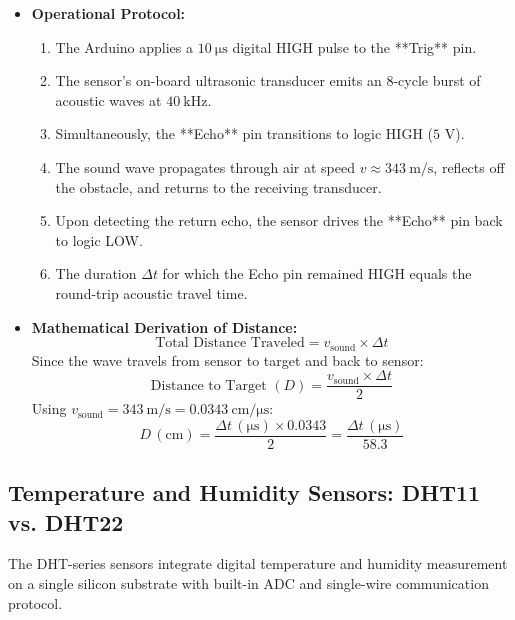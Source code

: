 \begin{itemize}
    \item \textbf{Operational Protocol:}
    \begin{enumerate}
        \item The Arduino applies a $\SI{10}{\micro\second}$ digital HIGH pulse to the **Trig** pin.
        \item The sensor's on-board ultrasonic transducer emits an 8-cycle burst of acoustic waves at $\SI{40}{\kilo\hertz}$.
        \item Simultaneously, the **Echo** pin transitions to logic HIGH ($5\text{ V}$).
        \item The sound wave propagates through air at speed $v \approx \SI{343}{\meter\per\second}$, reflects off the obstacle, and returns to the receiving transducer.
        \item Upon detecting the return echo, the sensor drives the **Echo** pin back to logic LOW.
        \item The duration $\Delta t$ for which the Echo pin remained HIGH equals the round-trip acoustic travel time.
    \end{enumerate}
    \item \textbf{Mathematical Derivation of Distance:}
    \begin{equation}
        \text{Total Distance Traveled} = v_{\text{sound}} \times \Delta t
    \end{equation}
    Since the wave travels from sensor to target and back to sensor:
    \begin{equation}
        \text{Distance to Target } (D) = \frac{v_{\text{sound}} \times \Delta t}{2}
    \end{equation}
    Using $v_{\text{sound}} = \SI{343}{\meter\per\second} = \SI{0.0343}{\centi\meter\per\micro\second}$:
    \begin{equation}
        D \, (\si{\centi\meter}) = \frac{\Delta t \, (\si{\micro\second}) \times 0.0343}{2} = \frac{\Delta t \, (\si{\micro\second})}{58.3}
    \end{equation}
\end{itemize}

\subsection{Temperature and Humidity Sensors: DHT11 vs. DHT22}
The DHT-series sensors integrate digital temperature and humidity measurement on a single silicon substrate with built-in ADC and single-wire communication protocol.

